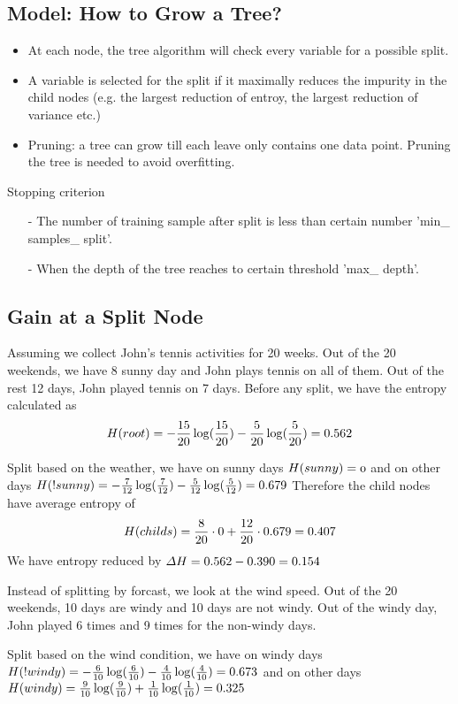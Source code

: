 \documentclass[12pt, oneside]{article}
\begin{document}
\subsection{Model: How to Grow a Tree?}
\begin{itemize}
\item At each node, the tree algorithm will check every variable for a possible split. 
\item A variable is selected for the split if it maximally reduces the impurity in the child nodes (e.g. the largest reduction of entroy, the largest reduction of variance etc.)
\item Pruning: a tree can grow till each leave only contains one data point. Pruning the tree is needed to avoid overfitting.
\end{itemize}

Stopping criterion
\begin{itemize}
\item[-] The number of training sample after split is less than certain number 'min\_ samples\_ split'.
\item[-] When the depth of the tree reaches to certain threshold 'max\_ depth'.
\end{itemize}

\subsection{ Gain at a Split Node}
Assuming we collect John's tennis activities for 20 weeks. Out of the 20 weekends, we have 8 sunny day and John plays tennis on all of them. Out of the rest 12 days, John played tennis on 7 days. 
Before any split, we have the entropy calculated as 
$$
\mathnormal{H(root)}=-\frac{15}{20}\log(\frac{15}{20})-\frac{5}{20}\log(\frac{5}{20})=0.562
$$

Split based on the weather, we have on sunny days
$
 \mathnormal{H(sunny)=0}
$
and on other days
$
\mathnormal{H(!sunny)}=-\frac{7}{12}\log(\frac{7}{12})-\frac{5}{12}\log(\frac{5}{12})=0.679
$
Therefore the child nodes have average entropy of 
$$
\mathnormal{H(childs)}=\frac{8}{20}\cdot 0+\frac{12}{20}\cdot 0.679=0.407
$$
We have entropy reduced by $\mathnormal{\Delta H}=0.562-0.390=0.154$

Instead of splitting by forcast, we look at the wind speed. Out of the 20 weekends, 10 days are windy and 10 days are not windy. Out of the windy day, John played 6 times and 9 times for the non-windy days.

Split based on the wind condition, we have on windy days
$
\mathnormal{H(!windy)}=-\frac{6}{10}\log(\frac{6}{10})-\frac{4}{10}\log(\frac{4}{10})=0.673
$
and on other days
$
\mathnormal{H(windy)}=\frac{9}{10} \log(\frac{9}{10})+\frac{1}{10} \log(\frac{1}{10})=0.325
$
\end{document}

